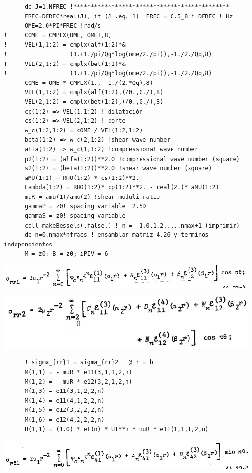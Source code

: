 \documentclass [11pt,spanish]{article}
\begin{document}
\begingroup
\fontsize{10pt}{12pt}
\selectfont
{}
\begin{shaded}
\begin{verbatim}
      do J=1,NFREC !*********************************************
      FREC=DFREC*real(J); if (J .eq. 1)  FREC = 0.5_8 * DFREC ! Hz
      OME=2.0*PI*FREC !rad/s
!     COME = CMPLX(OME, OMEI,8)
!     VEL(1,1:2) = cmplx(alf(1:2)*& 
!                  (1.+1./pi/Qq*log(ome/2./pi)),-1./2./Qq,8)
!     VEL(2,1:2) = cmplx(bet(1:2)*& 
!                  (1.+1./pi/Qq*log(ome/2./pi)),-1./2./Qq,8)
      COME = OME * CMPLX(1., -1./(2.*Qq),8)
      VEL(1,1:2) = cmplx(alf(1:2),(/0.,0./),8)
      VEL(2,1:2) = cmplx(bet(1:2),(/0.,0./),8)
      cp(1:2) => VEL(1,1:2) ! dilatación
      cs(1:2) => VEL(2,1:2) ! corte
      w_c(1:2,1:2) = cOME / VEL(1:2,1:2) 
      beta(1:2) => w_c(2,1:2) !shear wave number
      alfa(1:2) => w_c(1,1:2) !compressional wave number
      p2(1:2) = (alfa(1:2))**2.0 !compressional wave number (square)
      s2(1:2) = (beta(1:2))**2.0 !shear wave number (square)
      aMU(1:2) = RHO(1:2) * cs(1:2)**2.
      Lambda(1:2) = RHO(1:2)* cp(1:2)**2. - real(2.)* aMU(1:2)
      muR = amu(1)/amu(2) !shear moduli ratio
      gammaP = z0! spacing variable  2.5D
      gammaS = z0! spacing variable
      call makeBessels(.false.) ! n = -1,0,1,2,...,nmax+1 (imprimir)
      do n=0,nmax*nfracs ! ensamblar matriz 4.26 y terminos independientes
      M = z0; B = z0; iPIV = 6
\end{verbatim}
\end{shaded}
\endgroup
\includegraphics[scale=0.5]{srr1}

\includegraphics[scale=0.5]{srr2}
\begingroup
\fontsize{10pt}{12pt}
\selectfont
{}
\begin{shaded}
\begin{verbatim}
      ! sigma_{rr}1 = sigma_{rr}2   @ r = b
      M(1,1) = - muR * e11(3,1,1,2,n)
      M(1,2) = - muR * e12(3,2,1,2,n)
      M(1,3) = e11(3,1,2,2,n)
      M(1,4) = e11(4,1,2,2,n)
      M(1,5) = e12(3,2,2,2,n)
      M(1,6) = e12(4,2,2,2,n) 
      B(1,1) = (1.0) * et(n) * UI**n * muR * e11(1,1,1,2,n)
\end{verbatim}
\end{shaded}
\endgroup
\includegraphics[scale=0.5]{srt1}
\end{document}
